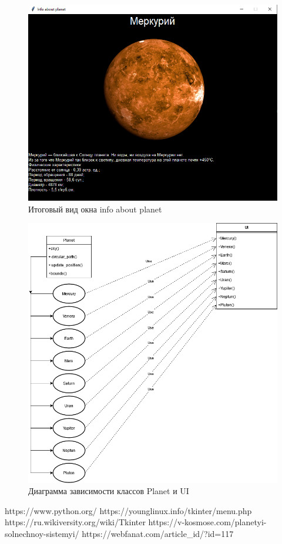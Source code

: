 \documentclass[11pt,a4paper]{report}
\begin{document}
\begin{figure}[h]
\centering
\includegraphics[width=0.78\linewidth]{1.png}
\caption{Итоговый вид окна info about planet}
\label{fig:mpr}

\end{figure}
\begin{figure}[h]
\centering
\includegraphics[width=1.0\linewidth]{3.png}
\caption{Диаграмма зависимости классов Planet и UI}
\label{fig:mpr}
\end{figure}



\begin{thebibliography}{5}
https://www.python.org/
https://younglinux.info/tkinter/menu.php
https://ru.wikiversity.org/wiki/Tkinter
https://v-kosmose.com/planetyi-solnechnoy-sistemyi/
https://webfanat.com/article\_id/?id=117
\end{thebibliography}
\end{document}
